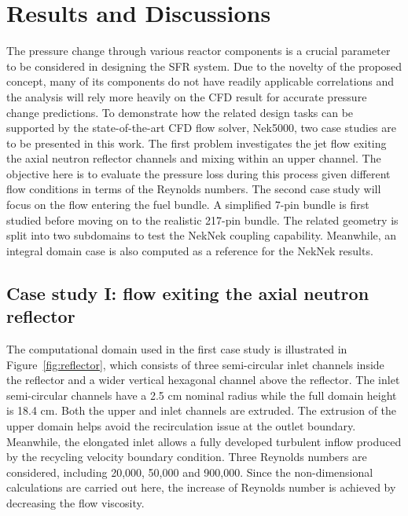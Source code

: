\section{Results and Discussions}
\label{sec:discuss}
The pressure change through various reactor components is a crucial parameter to be considered in designing the SFR system. Due to the novelty of the proposed concept, many of its components do not have readily applicable correlations and the analysis will rely more heavily on the CFD result for accurate pressure change predictions. To demonstrate how the related design tasks can be supported by the state-of-the-art CFD flow solver, Nek5000, two case studies are to be presented in this work. The first problem investigates the jet flow exiting the axial neutron reflector channels and mixing within an upper channel. The objective here is to evaluate the pressure loss during this process given different flow conditions in terms of the Reynolds numbers. The second case study will focus on the flow entering the fuel bundle. A simplified 7-pin bundle is first studied before moving on to the realistic 217-pin bundle. The related geometry is split into two subdomains to test the NekNek coupling capability. Meanwhile, an integral domain case is also computed as a reference for the NekNek results.  


\subsection{Case study I: flow exiting the axial neutron reflector}
\label{sec:results1}

The computational domain used in the first case study is illustrated in Figure~\ref{fig:reflector}, which consists of three semi-circular inlet channels inside the reflector and a wider vertical hexagonal channel above the reflector. The inlet semi-circular channels have a 2.5 cm nominal radius while the full domain height is 18.4 cm. Both the upper and inlet channels are extruded. The extrusion of the upper domain helps avoid the recirculation issue at the outlet boundary. Meanwhile, the elongated inlet allows a fully developed turbulent inflow produced by the recycling velocity boundary condition. Three Reynolds numbers are considered, including 20,000, 50,000 and 900,000. Since the non-dimensional calculations are carried out here, the increase of Reynolds number is achieved by decreasing the flow viscosity. 

